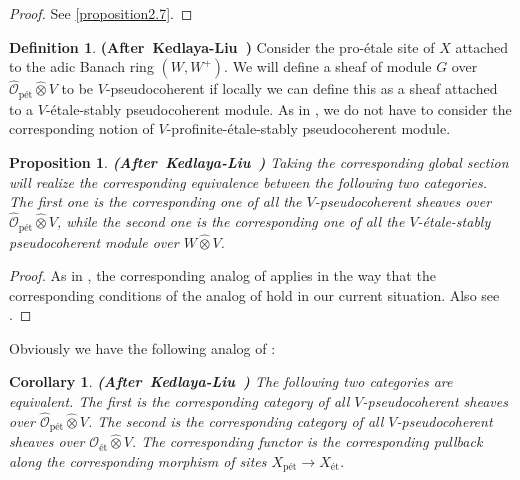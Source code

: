 \documentclass[12pt]{amsart}
\newtheorem{proposition}[theorem]{Proposition}
\newtheorem{corollary}[theorem]{Corollary}
\theoremstyle{definition}
\newtheorem{definition}[theorem]{Definition}
\numberwithin{equation}{section}
\begin{document}
\begin{proof}
See \cref{proposition2.7}.
\end{proof}




\begin{definition}\mbox{\bf{(After Kedlaya-Liu \cite[Definition 3.4.7]{KL2})}} 
Consider the pro-\'etale site of $X$ attached to the adic Banach ring $(W,W^+)$. We will define a sheaf of module $G$ over $\widehat{\mathcal{O}}_\text{p\'et}\widehat{\otimes}V$ to be $V$-pseudocoherent if locally we can define this as a sheaf attached to a $V$-\'etale-stably pseudocoherent module. As in \cite[Definition 3.4.7]{KL2}, we do not have to consider the corresponding notion of $V$-profinite-\'etale-stably pseudocoherent module.	
\end{definition}




\begin{proposition}\mbox{\bf{(After Kedlaya-Liu \cite[Theorem 3.4.8]{KL2})}} \label{proposition3.17}
Taking the corresponding global section will realize the corresponding equivalence between the following two categories. The first one is the corresponding one of all the $V$-pseudocoherent sheaves over $\widehat{\mathcal{O}}_\text{p\'et}\widehat{\otimes}V$, while the second one is the corresponding one of all the $V$-\'etale-stably pseudocoherent module over $W\widehat{\otimes}V$.
	
\end{proposition}


\begin{proof}
As in \cite[Theorem 3.4.8]{KL2}, the corresponding analog of \cite[Proposition 9.2.6]{KL1} applies in the way that the corresponding conditions of the analog of \cite[Proposition 9.2.6]{KL1} hold in our current situation. Also see \cite[Theorem 2.9.9, Remark 2.9.10 and Lemma 1.10.4]{Ked1}.
\end{proof}




\indent Obviously we have the following analog of \cite[Corollary 3.4.9]{KL2}:


\begin{corollary} \mbox{\bf{(After Kedlaya-Liu \cite[Corollary 3.4.9]{KL2})}}
The following two categories are equivalent. The first is the corresponding category of all $V$-pseudocoherent sheaves over $\widehat{\mathcal{O}}_\text{p\'et}\widehat{\otimes}V$. The second is the corresponding category of all $V$-pseudocoherent sheaves over ${\mathcal{O}}_\text{\'et}\widehat{\otimes}V$. The corresponding functor is the corresponding pullback along the corresponding morphism of sites $X_{\text{p\'et}}\rightarrow X_{\text{\'et}}$. 	
\end{corollary}
\end{document}
